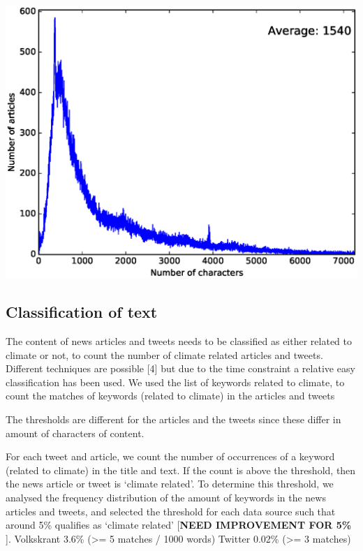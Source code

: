 \documentclass[paper=a4, fontsize=9px]{scrartcl} %
\numberwithin{equation}{section} %
\numberwithin{figure}{section} %
\numberwithin{table}{section} %
\newenvironment{Figure}
{\par\medskip\noindent\minipage{\linewidth}}
{\endminipage\par\medskip}
\begin{document}
\begin{multicols}{2}
\begin{Figure}
	\includegraphics[width=\textwidth]{img/articles_characters}
	\label{fig:9}
\end{Figure}



\subsection{Classification of text}

The content of news articles and tweets needs to be classified as either related to climate or not, to count the number of climate related articles and tweets. Different techniques are possible [4] but due to the time constraint a relative easy classification has been used. We used the list of keywords related to climate, to count the matches of keywords (related to climate) in the articles and tweets

The thresholds are different for the articles and the tweets since these differ in amount of characters of content. 

For each tweet and article, we count the number of occurrences of a keyword (related to climate) in the title and text. If the count is above the threshold, then the news article or tweet is `climate related’. To determine this threshold, we analysed the frequency distribution of the amount of keywords in the news articles and tweets, and selected the threshold for each data source such that around 5\% qualifies as `climate related’ [\textbf{NEED IMPROVEMENT FOR 5\%} ].
Volkskrant 3.6\% (>= 5 matches / 1000 words)
Twitter 0.02\% (>= 3 matches)


\end{multicols}
\end{document}
